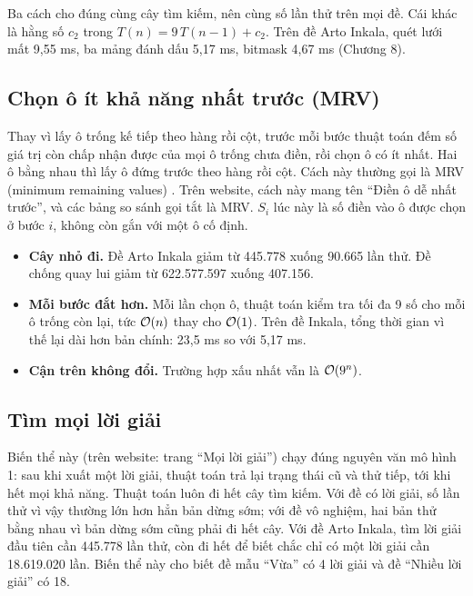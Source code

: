 Ba cách cho đúng cùng cây tìm kiếm, nên cùng số lần thử trên mọi đề. Cái khác là hằng số \(c_2\) trong \(T(n) = 9\,T(n - 1) + c_2\). Trên đề Arto Inkala, quét lưới mất 9,55 ms, ba mảng đánh dấu 5,17 ms, bitmask 4,67 ms (Chương 8).

\subsection*{Chọn ô ít khả năng nhất trước (MRV)}

Thay vì lấy ô trống kế tiếp theo hàng rồi cột, trước mỗi bước thuật toán đếm số giá trị còn chấp nhận được của mọi ô trống chưa điền, rồi chọn ô có ít nhất. Hai ô bằng nhau thì lấy ô đứng trước theo hàng rồi cột. Cách này thường gọi là MRV (minimum remaining values) \cite{norvig-sudoku, wikipedia-sudoku-algorithms}. Trên website, cách này mang tên ``Điền ô dễ nhất trước'', và các bảng so sánh gọi tắt là MRV. \(S_i\) lúc này là số điền vào ô được chọn ở bước \(i\), không còn gắn với một ô cố định.

\begin{itemize}
  \item \textbf{Cây nhỏ đi.} Đề Arto Inkala giảm từ 445.778 xuống 90.665 lần thử. Đề chống quay lui giảm từ 622.577.597 xuống 407.156.
  \item \textbf{Mỗi bước đắt hơn.} Mỗi lần chọn ô, thuật toán kiểm tra tối đa 9 số cho mỗi ô trống còn lại, tức \(\mathcal{O}\!\left(n\right)\) thay cho \(\mathcal{O}\!\left(1\right)\). Trên đề Inkala, tổng thời gian vì thế lại dài hơn bản chính: 23,5 ms so với 5,17 ms.
  \item \textbf{Cận trên không đổi.} Trường hợp xấu nhất vẫn là \(\mathcal{O}\!\left(9^n\right)\).
\end{itemize}

\subsection*{Tìm mọi lời giải}

Biến thể này (trên website: trang ``Mọi lời giải'') chạy đúng nguyên văn mô hình 1: sau khi xuất một lời giải, thuật toán trả lại trạng thái cũ và thử tiếp, tới khi hết mọi khả năng. Thuật toán luôn đi hết cây tìm kiếm. Với đề có lời giải, số lần thử vì vậy thường lớn hơn hẳn bản dừng sớm; với đề vô nghiệm, hai bản thử bằng nhau vì bản dừng sớm cũng phải đi hết cây. Với đề Arto Inkala, tìm lời giải đầu tiên cần 445.778 lần thử, còn đi hết để biết chắc chỉ có một lời giải cần 18.619.020 lần. Biến thể này cho biết đề mẫu ``Vừa'' có 4 lời giải và đề ``Nhiều lời giải'' có 18.

